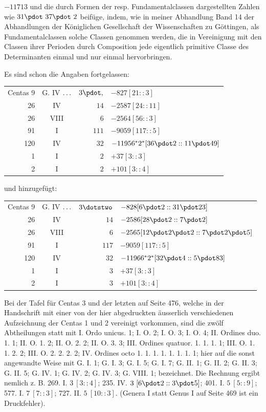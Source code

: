 $-11713$ und die durch Formen der resp. Fundamentalclassen dargestellten Zahlen wie $31\pdot\ 37\pdot\ 2$ beifüge, indem, wie in meiner Abhandlung Band 14 der Abhandlungen der Königlichen Gesellschaft der Wissenschaften zu Göttingen, als Fundamentalclassen solche Classen genommen werden, die in Vereinigung mit den Classen ihrer Perioden durch Composition jede eigentlich primitive Classe des Determinanten einmal und nur einmal hervorbringen.
\par{}Es sind schon die Angaben fortgelassen:
\begin{longtable}{rcrl}
Centas 9 & G. IV $\mathinner{.\,.\,.}$ & $3\pdot,$ & $-827[21::3]$ \\
26 & IV & $14$ & $-2587[24::11]$ \\
26 & VIII & $6$ & $-2564[56::3]$ \\
91 & I & $111$ & $-9059[117::5]$ \\
120 & IV & $32$ & $-11956{}^{*}2^{*}[36\pdot2::11\pdot49]$ \\
1 & I & $2$ & $+37[3::3]$ \\
2 & I & $2$ & $+101[3::4]$ \\
\end{longtable}
\par{}und hinzugefügt:
\begin{longtable}{rcrl}
Centas 9 & G. IV $\mathinner{.\,.\,.}$ & $3\dotstwo$ & $-828[6\pdot2::31\pdot23]$ \\
26 & IV & $14$ & $-2586[28\pdot2::7\pdot2]$ \\
26 & VIII & $6$ & $-2565[12\pdot2\pdot2::7\pdot2\pdot5]$ \\
91 & I & $117$ & $-9059[117::5]$ \\
120 & IV & $32$ & $-11966{}^{*}2^{*}[32\pdot4::5\pdot83]$ \\
1 & I & $3$ & $+37[3::3]$ \\
2 & I & $3$ & $+101[3::4]$ \\
\end{longtable}
\par Bei der Tafel für Centas 3 und der letzten auf Seite 476, welche in der Handschrift mit einer von der hier abgedruckten äusserlich verschiedenen Aufzeichnung der Centas 1 und 2 vereinigt vorkommen, sind die zwölf Abtheilungen statt mit I. Ordo unicus. 1; I. O. 2; I. O. 3; I. O. 4; II. Ordines duo. 1. 1; II. O. 1. 2; II. O. 2. 2; II. O. 3. 3; III. Ordines quatuor. 1. 1. 1. 1; III. O. 1. 1. 2. 2; III. O. 2. 2. 2. 2; IV. Ordines octo 1. 1. 1. 1. 1. 1. 1. 1; hier auf die sonst angewandte Weise mit G. I. 1; G. I. 3; G. I. 5; G. I. 7; G. II. 1; G. II. 2; G. II. 3; G. II. 5; G. IV. 1; G. IV. 2; G. IV. 3; G. VIII. 1; bezeichnet. Die Rechnung ergibt nemlich z. B. 269. I. $3\ [3::4]$; 235. IV. $3\ [6\pdot2::3\pdot5]$; 401. I. $5\ [5::9]$; 577. I. $7\ [7::3]$; 727. II. $5\ [10::3]$. (Genera I statt Genus I auf Seite 469 ist ein Druckfehler).
